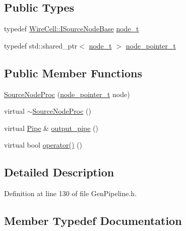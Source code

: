 \subsection*{Public Types}
\begin{DoxyCompactItemize}
\item 
typedef \hyperlink{class_wire_cell_1_1_i_source_node_base}{Wire\+Cell\+::\+I\+Source\+Node\+Base} \hyperlink{class_wire_cell_1_1_source_node_proc_ae97fce28465567fec0df1469216df566}{node\+\_\+t}
\item 
typedef std\+::shared\+\_\+ptr$<$ \hyperlink{class_wire_cell_1_1_source_node_proc_ae97fce28465567fec0df1469216df566}{node\+\_\+t} $>$ \hyperlink{class_wire_cell_1_1_source_node_proc_a66e3f8eee94e1a78f32cd32dcdab1c9a}{node\+\_\+pointer\+\_\+t}
\end{DoxyCompactItemize}
\subsection*{Public Member Functions}
\begin{DoxyCompactItemize}
\item 
\hyperlink{class_wire_cell_1_1_source_node_proc_a628bcfe159927baa74396bc7b46ed421}{Source\+Node\+Proc} (\hyperlink{class_wire_cell_1_1_source_node_proc_a66e3f8eee94e1a78f32cd32dcdab1c9a}{node\+\_\+pointer\+\_\+t} node)
\item 
virtual \hyperlink{class_wire_cell_1_1_source_node_proc_a0357127656bfc3658cc63514753ae323}{$\sim$\+Source\+Node\+Proc} ()
\item 
virtual \hyperlink{namespace_wire_cell_afce9bb01c731347c3d4c8ca9d4ed804f}{Pipe} \& \hyperlink{class_wire_cell_1_1_source_node_proc_af23d814862a6fed4a20e37313255c179}{output\+\_\+pipe} ()
\item 
virtual bool \hyperlink{class_wire_cell_1_1_source_node_proc_abd977752a7aa067206eea94ac69c940a}{operator()} ()
\end{DoxyCompactItemize}


\subsection{Detailed Description}


Definition at line 130 of file Gen\+Pipeline.\+h.



\subsection{Member Typedef Documentation}
\mbox{\label{class_wire_cell_1_1_source_node_proc_a66e3f8eee94e1a78f32cd32dcdab1c9a}} 
